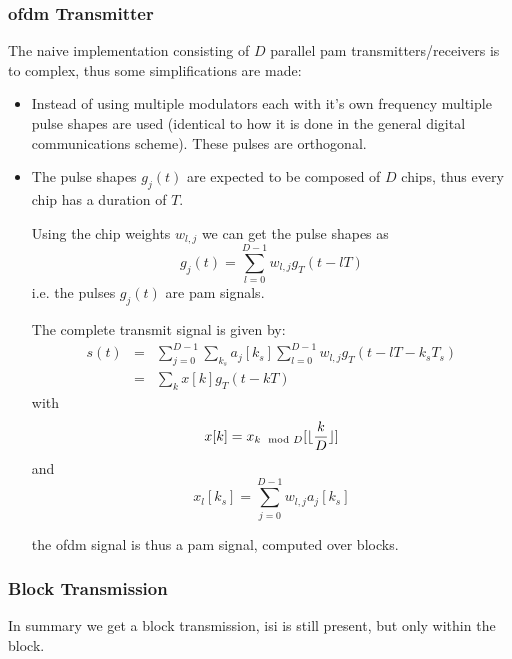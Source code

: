 \subsubsection{\acl{ofdm} Transmitter}
The naive implementation consisting of $D$ parallel \ac{pam} transmitters/receivers
is to complex, thus some simplifications are made:
\begin{itemize}
    \item Instead of using multiple modulators each with it's own frequency multiple
        pulse shapes are used (identical to how it is done in the general digital
        communications scheme). These pulses are orthogonal.
    \item The pulse shapes $g_j(t)$ are expected to be composed of $D$ chips,
        thus every chip has a duration of $T$.

        Using the chip weights $w_{l,j}$ we can get the pulse shapes as
        \begin{equation}
            g_j(t) = \sum_{l=0}^{D-1} w_{l,j} g_T(t - lT)
        \end{equation}
        i.e. the pulses $g_j(t)$ are \ac{pam} signals.

        The complete transmit signal is given by:
        \begin{eqnarray}
            s(t) &=& \sum_{j=0}^{D-1} \sum_{k_s} a_j[k_s] \sum_{l=0}^{D-1}
                w_{l,j} g_T(t-lT - k_s T_s) \\
                &=& \sum_k x[k] g_T(t-kT)
        \end{eqnarray}
        with 
        \begin{equation}
            x[k] = x_{k \mod D}[\lfloor\frac{k}{D}\rfloor]
        \end{equation}
        and 
        \begin{equation}
            x_l[k_s] = \sum_{j=0}^{D-1} w_{l,j} a_j[k_s]
        \end{equation}

        the \ac{ofdm} signal is thus a \ac{pam} signal, computed over blocks.
\end{itemize}

\subsubsection{Block Transmission}
In summary we get a block transmission, \ac{isi} is still present, but only within
the block.

